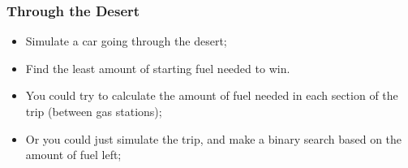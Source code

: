 \begin{frame}
  \frametitle{Through the Desert}
  {\small
    \begin{block}{}
      \begin{itemize}
      \item Simulate a car going through the desert;
      \item Find the least amount of starting fuel needed to win.
      \end{itemize}
    \end{block}

    \begin{itemize}
    \item You could try to calculate the amount of fuel needed in each
      section of the trip (between gas stations);
    \item Or you could just simulate the trip, and make a binary
      search based on the amount of fuel left;
    \end{itemize}
  }
\end{frame}
